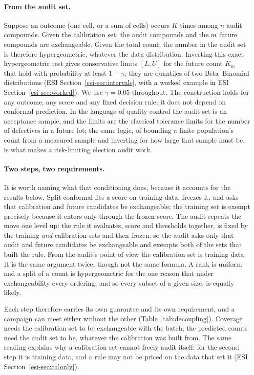 \documentclass[twocolumn,10pt]{article}
\begin{document}
\paragraph{From the audit set.} Suppose an outcome (one cell, or a sum of cells) occurs $K$ times among $n$ audit compounds. Given the calibration set, the audit compounds and the $m$ future compounds are exchangeable. Given the total count, the number in the audit set is therefore hypergeometric, whatever the data distribution. Inverting this exact hypergeometric test gives conservative limits $[L,U]$ for the future count $K_m$ that hold with probability at least $1-\gamma$; they are quantiles of two Beta--Binomial distributions\citep{Thatcher1964} (ESI Section~\ref{esi-sec:intervals}, with a worked example in ESI Section~\ref{esi-sec:worked}). We use $\gamma=0.05$ throughout. The construction holds for any outcome, any score and any fixed decision rule; it does not depend on conformal prediction. In the language of quality control the audit set is an acceptance sample, and the limits are the classical tolerance limits for the number of defectives in a future lot; the same logic, of bounding a finite population's count from a measured sample and inverting for how large that sample must be, is what makes a risk-limiting election audit work.\citep{Stark2008Audits,Lindeman2012RLA}\citep{DodgeRomig1944,Wilks1941}

\paragraph{Two steps, two requirements.} It is worth naming what that conditioning does, because
it accounts for the results below. Split conformal fits a score on training data, freezes it, and
asks that calibration and future candidates be exchangeable; the training set is exempt precisely
because it enters only through the frozen score. The audit repeats the move one level up: the rule
it evaluates, score and thresholds together, is fixed by the training \emph{and} calibration sets
and then frozen, so the audit asks only that audit and future candidates be exchangeable and
exempts both of the sets that built the rule. From the audit's point of view the calibration set
is training data. It is the same argument twice, though not the same formula. A rank is uniform
and a split of a count is hypergeometric for the one reason that under exchangeability every
ordering, and so every subset of a given size, is equally likely.

Each step therefore carries its own guarantee and its own requirement, and a campaign can meet
either without the other (Table~\ref{tab:decoupling}). Coverage needs the calibration set to be
exchangeable with the batch; the predicted counts need the audit set to be, whatever the
calibration was built from. The same reading explains why a calibration set cannot freely audit
itself: for the second step it is training data, and a rule may not be priced on the data that
set it (ESI Section~\ref{esi-sec:calonly}).
\end{document}
